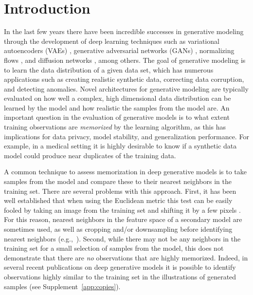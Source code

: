 \documentclass{article}
\begin{document}
\section{Introduction}
\label{sec:intro}
In the last few years there have been incredible successes in generative 
modeling through the development of deep learning techniques such as 
variational autoencoders (VAEs) \cite{kingma2014auto,rezende2014stochastic}, 
generative adversarial networks (GANs) \cite{goodfellow2014generative}, 
normalizing flows \cite{tabak2013family,rezende2015variational}, and diffusion 
networks \cite{sohl2015deep,ho2020denoising}, among others. The goal of 
generative modeling is to learn the data distribution of a given data set, 
which has numerous applications such as creating realistic synthetic data, 
correcting data corruption, and detecting anomalies. Novel architectures for 
generative modeling are typically evaluated on how well a complex, high 
dimensional data distribution can be learned by the model and how realistic 
the samples from the model are. An important question in the evaluation of 
generative models is to what extent training observations are \emph{memorized} 
by the learning algorithm, as this has implications for data privacy, model 
stability, and generalization performance. For example, in a medical setting 
it is highly desirable to know if a synthetic data model could produce near 
duplicates of the training data.

A common technique to assess memorization in deep generative models is to take 
samples from the model and compare these to their nearest neighbors in the 
training set. There are several problems with this approach.  First, it has 
been well established that when using the Euclidean metric this test can be 
easily fooled by taking an image from the training set and shifting it by a 
few pixels \cite{theis2016note}.  For this reason, nearest neighbors in the 
feature space of a secondary model are sometimes used, as well as cropping 
and/or downsampling before identifying nearest neighbors 
(e.g.,~\cite{karras2018progressive,brock2018large,vahdat2020nvae}). Second, 
while there may not be any neighbors in the training set for a small selection 
of samples from the model, this does not demonstrate that there are \emph{no} 
observations that are highly memorized. Indeed, in several recent publications 
on deep generative models it is possible to identify observations highly 
similar to the training set in the illustrations of generated samples (see 
Supplement~\ref{app:copies}).
\end{document}
